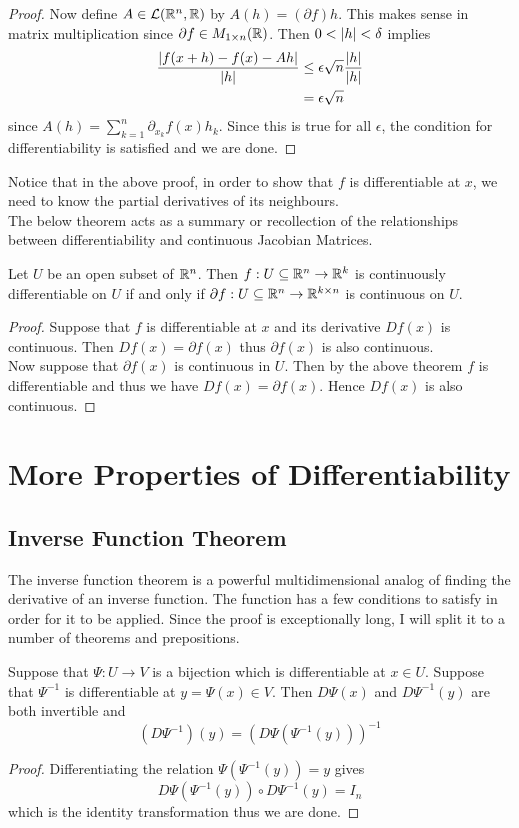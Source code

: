 \documentclass[a4paper]{article}
\begin{document}
\begin{thm}{}{}
\begin{proof}
Now define $A\in\mathcal{L}(\mathbb{R}^n,\mathbb{R})$ by $A(h)=(\partial f)h$. This makes sense in matrix multiplication since $\partial f\in M_{1\times n}(\mathbb{R})$. Then $0<\abs{h}<\delta$ implies 
\begin{align*}
\frac{\abs{f(x+h)-f(x)-Ah}}{\abs{h}}&\leq\epsilon\sqrt{n}\frac{\abs{h}}{\abs{h}}\\
&=\epsilon\sqrt{n}
\end{align*} since $A(h)=\sum_{k=1}^n\partial_{x_k}f(x)h_k$. Since this is true for all $\epsilon$, the condition for differentiability is satisfied and we are done. 
\end{proof}
\end{thm}

Notice that in the above proof, in order to show that $f$ is differentiable at $x$, we need to know the partial derivatives of its neighbours. \\

The below theorem acts as a summary or recollection of the relationships between differentiability and continuous Jacobian Matrices. 

\begin{thm}{}{} Let $U$ be an open subset of $\mathbb{R}^n$. Then $f:U\subseteq\mathbb{R}^n\to\mathbb{R}^k$ is continuously differentiable on $U$ if and only if $\partial f:U\subseteq\mathbb{R}^n\to\mathbb{R}^{k\times n}$ is continuous on $U$. 
\begin{proof}
Suppose that $f$ is differentiable at $x$ and its derivative $Df(x)$ is continuous. Then $Df(x)=\partial f(x)$ thus $\partial f(x)$ is also continuous. \\
Now suppose that $\partial f(x)$ is continuous in $U$. Then by the above theorem $f$ is differentiable and thus we have $Df(x)=\partial f(x)$. Hence $Df(x)$ is also continuous. 
\end{proof}
\end{thm}

\pagebreak
\section{More Properties of Differentiability}
\subsection{Inverse Function Theorem}
The inverse function theorem is a powerful multidimensional analog of finding the derivative of an inverse function. The function has a few conditions to satisfy in order for it to be applied. Since the proof is exceptionally long, I will split it to a number of theorems and prepositions. 
\begin{prp}{}{} Suppose that $\Psi:U\to V$ is a bijection which is differentiable at $x\in U$. Suppose that $\Psi^{-1}$ is differentiable at $y=\Psi(x)\in V$. Then $D\Psi(x)$ and $D\Psi^{-1}(y)$ are both invertible and $$(D\Psi^{-1})(y)=(D\Psi(\Psi^{-1}(y)))^{-1}$$ 
\begin{proof}
Differentiating the relation $\Psi(\Psi^{-1}(y))=y$ gives $$D\Psi(\Psi^{-1}(y))\circ D\Psi^{-1}(y)=I_n$$ which is the identity transformation thus we are done. 
\end{proof}
\end{prp}
\end{document}
